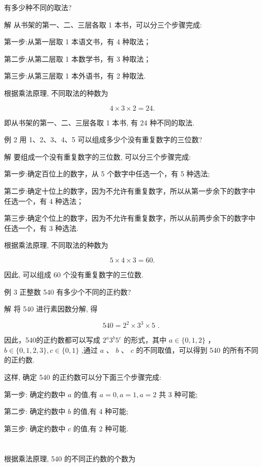 \documentclass[10pt]{article}
\begin{document}
有多少种不同的取法?

解 从书架的第一、二、三层各取 1 本书，可以分三个步骤完成:

第一步:从第一层取 1 本语文书，有 4 种取法；

第二步:从第二层取 1 本数学书，有 3 种取法；

第三步:从第三层取 1 本外语书，有 2 种取法.

根据乘法原理, 不同取法的种数为

\[
4 \times  3 \times  2 = {24}.
\]

即从书架的第一、二、三层各取 1 本书, 有 24 种不同的取法.

例 2 用 1、2、3、4、5 可以组成多少个没有重复数字的三位数?

解 要组成一个没有重复数字的三位数, 可以分三个步骤完成:

第一步:确定百位上的数字，从 5 个数字中任选一个，有 5 种选法;

第二步:确定十位上的数字，因为不允许有重复数字，所以从第一步余下的数字中任选一个，有 4 种选法；

第三步:确定个位上的数字，因为不允许有重复数字，所以从前两步余下的数字中任选一个，有 3 种选法.

根据乘法原理, 不同取法的种数为

\[
5 \times  4 \times  3 = {60}.
\]

因此, 可以组成 60 个没有重复数字的三位数.

例 3 正整数 540 有多少个不同的正约数?

解 将 540 进行素因数分解, 得

\[
{540} = {2}^{2} \times  {3}^{3} \times  5\text{ . }
\]

因此，540的正约数都可以写成 \({2}^{a}{3}^{b}{5}^{c}\) 的形式，其中 \(a \in  \{ 0,1,2\}\) ， \(b \in  \{ 0,1,2,3\} ,c \in  \{ 0,1\}\) ,通过 \(a\text{ 、 }b\text{ 、 }c\) 的不同取值，可以得到 540 的所有不同的正约数.

这样, 确定 540 的正约数可以分下面三个步骤完成:

第一步: 确定约数中 \(a\) 的值,有 \(a = 0,a = 1,a = 2\) 共 3 种可能;

第二步: 确定约数中 \(b\) 的值,有 4 种可能;

第三步: 确定约数中 \(c\) 的值,有 2 种可能.



\section*{}

根据乘法原理, 540 的不同正约数的个数为
\end{document}
